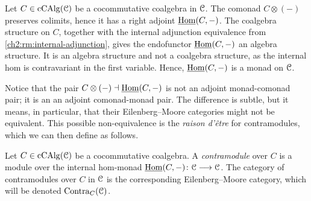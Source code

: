 \begin{example}
    Let $C\in \operatorname{cCAlg}(\EuScript{C})$ be a cocommutative coalgebra in $\EuScript{C}$. The comonad $C\otimes (-)$ preserves colimits, hence it has a right adjoint $\operatorname{\underline{Hom}}(C,-)$. The coalgebra structure on $C$, together with the internal adjunction equivalence from \cref{ch2:rm:internal-adjunction}, gives the endofunctor $\operatorname{\underline{Hom}}(C,-)$ an algebra structure. It is an algebra structure and not a coalgebra structure, as the internal hom is contravariant in the first variable. Hence, $\operatorname{\underline{Hom}}(C,-)$ is a monad on $\EuScript{C}$.
\end{example} 

Notice that the pair $C\otimes(-)\dashv \operatorname{\underline{Hom}}(C,-)$ is not an adjoint monad-comonad pair; it is an an adjoint comonad-monad pair. The difference is subtle, but it means, in particular, that their Eilenberg--Moore categories might not be equivalent. This possible non-equivalence is the \emph{raison d'être} for contramodules, which we can then define as follows.





\begin{definition}
    Let $C\in \operatorname{cCAlg}(\EuScript{C})$ be a cocommutative coalgebra. A \emph{contramodule} over $C$ is a module over the internal hom-monad $\operatorname{\underline{Hom}}(C,-)\colon\EuScript{C}\longrightarrow \EuScript{C}$. The category of contramodules over $C$ in $\EuScript{C}$ is the corresponding Eilenberg--Moore category, which will be denoted $\mathrm{Contra}_C(\EuScript{C})$. 
\end{definition}

